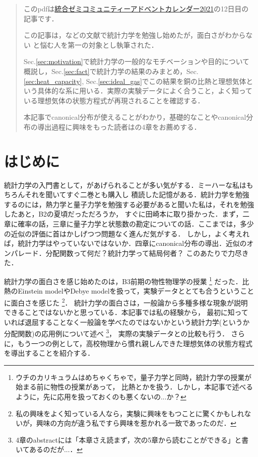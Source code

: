 \begin{abstract}
    このpdfは\href{https://adventar.org/calendars/6268}{統合ゼミコミュニティーアドベントカレンダー2021}の12日目の記事です．
    
    この記事は，\cite{}などの文献で統計力学を勉強し始めたが，面白さがわからない
    と悩む人を第一の対象とし執筆された．
	
	Sec.\ref{sec:motivation}で統計力学の一般的なモチベーションや目的について概説し，Sec.\ref{sec:fact}で統計力学の結果のみまとめ，Sec.\ref{sec:heat_capacity}, Sec.\ref{sec:ideal_gas}でこの結果を銅の比熱と理想気体という具体的な系に用いる．実際の実験データによく合うこと，よく知っている理想気体の状態方程式が再現されることを確認する．

	本記事でcanonical分布が使えることがわかり，基礎的なことやcanonical分布の導出過程に興味をもった読者は\cite{Tasaki_statmech}の4章をお薦めする．
\end{abstract}
\section{はじめに}
    統計力学の入門書として，\cite{Tasaki_statmech}があげられることが多い気がする．ミーハーな私はもちろんそれを聞いてすぐ二巻とも購入し
    積読した記憶がある．統計力学を勉強するのには，熱力学と量子力学を勉強する必要があると聞いた私は，それを勉強したあと，B2の夏頃だっただろうか，
    すぐに田崎本に取り掛かった．まず，二章に確率の話，三章に量子力学と状態数の勘定についての話．ここまでは，多少の近似の評価に首はかしげつつ問題なく進んだ気がする．
    しかし，よく考えれば，統計力学はやっていないではないか．四章にcanonical分布の導出．近似のオンパレード．分配関数って何だ？統計力学って結局何者？
    このあたりで力尽きた．

    統計力学の面白さを感じ始めたのは，B3前期の物性物理学の授業
    \footnote{ウチのカリキュラムはめちゃくちゃで，量子力学と同時，統計力学の授業が始まる前に物性の授業があって，
    比熱とかを扱う．しかし，本記事で述べるように，先に応用を扱っておくのも悪くないの...か？}
    だった．比熱のEinstein modelやDebye modelを扱って，実験データととても合うということに面白さを感じた
	\footnote{
			私の興味をよく知っている人なら，実験に興味をもつことに驚くかもしれないが，興味の方向が違う私ですら興味を惹かれる一致であったのだ．
	}．
    統計力学の面白さは，一般論から多種多様な現象が説明できることではないかと思っている．本記事では私の経験から，
    最初に知っていれば退屈することなく一般論を学べたのではないかという統計力学(というか分配関数)の応用例について述べ
	\footnote{
			\cite{Tasaki_statmech}4章のabstractには「本章さえ読まず，次の5章から読むことができる」と書いてあるのだが...．
	}，
    実際の実験データ\cite{doi:10.1063/1.555728}との比較も行う．
	さらに，もう一つの例として，高校物理から慣れ親しんできた理想気体の状態方程式を導出することを紹介する．


